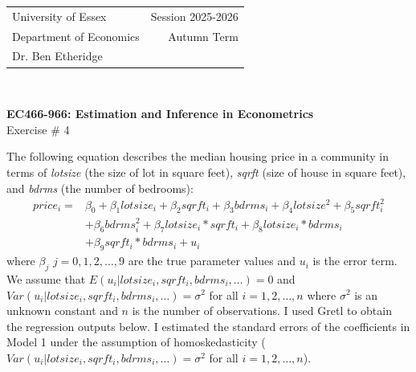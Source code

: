 \documentclass[12pt,a4paper]{article}
\begin{document}
\begin{tabular}{l r}
University of Essex  \hspace{35ex}& Session 2025-2026 \\
Department of Economics \hspace{35ex} & Autumn Term\\
Dr. Ben Etheridge \hspace{35ex} &
\end{tabular}
\\
\begin{center}
\large{\textbf{EC466-966: Estimation and Inference in Econometrics }\\
Exercise \# 4}
\end{center}
\vspace*{0.5cm}

The following equation describes the median housing price in a community in terms of \emph{lotsize} (the size of lot in square feet), \emph{sqrft} (size of house in square feet), and \emph{bdrms} (the number of bedrooms):
\begin{align}
\label{eq:nonlog}
price_{i}=&\beta_{0}+\beta_{1}lotsize_{i}+\beta_{2}sqrft_{i}+\beta_{3}bdrms_{i}+\beta_{4}lotsize^{2}+\beta_{5}sqrft^{2}_{i}\\
&+\beta_{6}bdrms^{2}_{i}+\beta_{7}lotsize_{i}*sqrft_{i}+\beta_{8}lotsize_{i}*bdrms_{i} \nonumber\\
&+\beta_{9}sqrft_{i}*bdrms_{i}+u_{i}\nonumber
\end{align}
where $\beta_{j}$ $j=0,1,2,\dots,9$ are the true parameter values and $u_{i}$ is the error term. We assume that $E(u_{i}|lotsize_{i}, sqrft_{i}, bdrms_{i}, \dots)=0$ and $Var(u_{i}| lotsize_{i}, sqrft_{i}, bdrms_{i}, \dots)=\sigma^{2}$ for all $i=1,2,\dots,n$ where $\sigma^{2}$ is an unknown constant and $n$ is the number of observations. I used Gretl to obtain the regression outputs below. I estimated the standard errors of the coefficients in Model 1 under the assumption of homoskedasticity ($Var(u_{i}| lotsize_{i}, sqrft_{i}, bdrms_{i}, \dots)=\sigma^{2}$ for all $i=1,2,\dots,n$). 
\newpage
\end{document}
